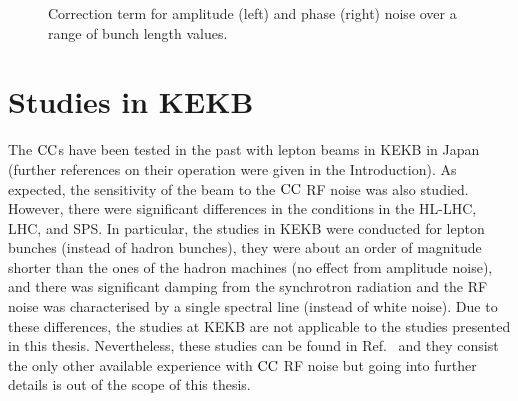 \begin{figure}[!ht]
\begin{subfigure}[t]{0.45\textwidth}
    \end{subfigure}
    \hfill
     \caption{Correction term for amplitude (left) and phase (right) noise over a range of bunch length values.} %
     \label{fig:correction_term_bunch_length}
 \end{figure}


\section{Studies in KEKB}\label{eq:past_studies_KEKB}
The ${\mathrm{CC}}$s have been tested in the past with lepton beams in KEKB in Japan (further references on their operation were given in the Introduction). %
As expected, the sensitivity of the beam to the ${\mathrm{CC}}$ RF noise was also studied. However, there were significant differences in the conditions in the HL-LHC, LHC, and SPS. In particular, the studies in KEKB were conducted for lepton bunches (instead of hadron bunches), they were about an order of magnitude shorter than the ones of the hadron machines (no effect from amplitude noise), and there was significant damping from the synchrotron radiation and the RF noise was characterised by a single spectral line (instead of white noise). Due to these differences, the studies at KEKB are not applicable to the studies presented in this thesis. Nevertheless, these studies can be found in Ref.~\cite{PhysRevSTAB.14.111003} and they consist the only other available experience with ${\mathrm{CC}}$ RF noise but going into further details is out of the scope of this thesis.